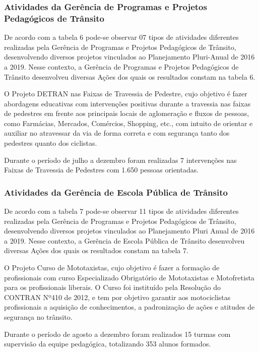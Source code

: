 \documentclass[a4paper]{article}
\begin{document}
\subsubsection{Atividades da Gerência de Programas e Projetos Pedagógicos de Trânsito}

De acordo com a tabela 6 pode-se observar 07 tipos de atividades diferentes realizadas pela Gerência de Programas e Projetos Pedagógicos de Trânsito, desenvolvendo diversos projetos vinculados ao Planejamento Pluri-Anual de 2016 a 2019. Nesse contexto, a Gerência de Programas e Projetos Pedagógicos de Trânsito desenvolveu diversas Ações dos quais os resultados constam na tabela 6.\vskip0.3cm

O Projeto DETRAN nas Faixas de Travessia de Pedestre, cujo objetivo é fazer abordagens educativas com intervenções positivas durante a travessia nas faixas de pedestres em frente aos principais locais de aglomeração e fluxos de pessoas, como Farmácias, Mercados, Comércios, Shopping, etc., com intuito de orientar e auxiliar no atravessar da via de forma correta e com segurança tanto dos pedestres quanto dos ciclistas.
\vskip0.3cm

Durante o período de julho a dezembro foram realizadas 7 intervenções nas Faixas de Travessia de Pedestres com 1.650 pessoas orientadas. 

\subsubsection{Atividades da Gerência de Escola Pública de Trânsito}

De acordo com a tabela 7 pode-se observar 11 tipos de atividades diferentes realizadas pela Gerência de Programas e Projetos Pedagógicos de Trânsito, desenvolvendo diversos projetos vinculados ao Planejamento Pluri Anual de 2016 a 2019. Nesse contexto, a Gerência de Escola Pública de Trânsito desenvolveu diversas Ações dos quais os resultados constam na tabela 7.\vskip0.3cm

O Projeto Curso de Mototaxistas, cujo objetivo é fazer a formação de profissionais com curso Especializado Obrigatório de Mototaxistas e Motofretista para os profissionais liberais. O Curso foi instituído pela Resolução do CONTRAN Nº410 de 2012, e tem por objetivo garantir aos motociclistas profissionais a aquisição de conhecimentos, a padronização de ações e atitudes de segurança no trânsito.\vskip0.3cm

Durante o período de agosto a dezembro foram realizados 15 turmas com supervisão da equipe pedagógica, totalizando 353 alunos formados.
\end{document}
